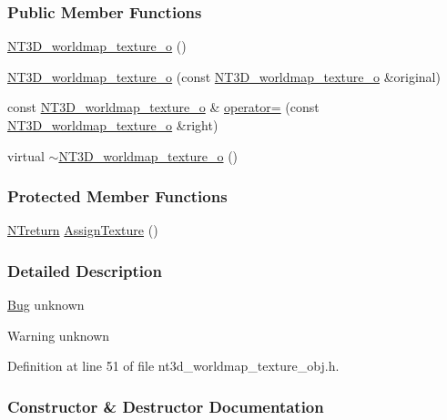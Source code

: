 \subsubsection*{Public Member Functions}
\begin{DoxyCompactItemize}
\item 
\hyperlink{class_n_t3_d__worldmap__texture__o_ae5470b7dbfd334c3266212d4fba3cd2a}{NT3D\_\-worldmap\_\-texture\_\-o} ()
\item 
\hyperlink{class_n_t3_d__worldmap__texture__o_afdcc71cd0a42f13e7be2ecbc187c9f53}{NT3D\_\-worldmap\_\-texture\_\-o} (const \hyperlink{class_n_t3_d__worldmap__texture__o}{NT3D\_\-worldmap\_\-texture\_\-o} \&original)
\item 
const \hyperlink{class_n_t3_d__worldmap__texture__o}{NT3D\_\-worldmap\_\-texture\_\-o} \& \hyperlink{class_n_t3_d__worldmap__texture__o_a268c6fb45cf5ae62570f91fe9f185f0f}{operator=} (const \hyperlink{class_n_t3_d__worldmap__texture__o}{NT3D\_\-worldmap\_\-texture\_\-o} \&right)
\item 
virtual \hyperlink{class_n_t3_d__worldmap__texture__o_a5fd617b2c2d76c0870124f546170531b}{$\sim$NT3D\_\-worldmap\_\-texture\_\-o} ()
\end{DoxyCompactItemize}
\subsubsection*{Protected Member Functions}
\begin{DoxyCompactItemize}
\item 
\hyperlink{nt__types_8h_ab9564ee8f091e809d21b8451c6683c53}{NTreturn} \hyperlink{class_n_t3_d__worldmap__texture__o_ac8d7dc1c884f0c45e525d87c04f14189}{AssignTexture} ()
\end{DoxyCompactItemize}


\subsubsection{Detailed Description}
\begin{Desc}
\item[\hyperlink{bug__bug000052}{Bug}]unknown \end{Desc}
\begin{DoxyWarning}{Warning}
unknown 
\end{DoxyWarning}


Definition at line 51 of file nt3d\_\-worldmap\_\-texture\_\-obj.h.



\subsubsection{Constructor \& Destructor Documentation}
